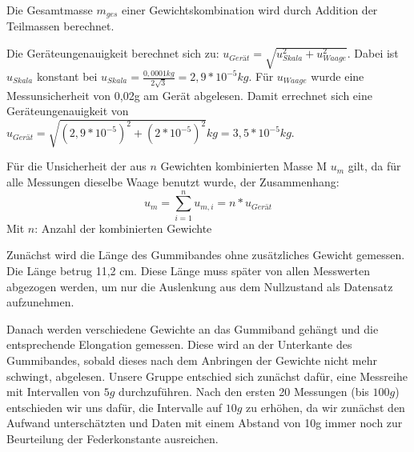 \documentclass[class=article, crop=false]{standalone}
\newenvironment{Shaded}{\begin{snugshade}}{\end{snugshade}}
\newcommand{\CommentTok}[1]{\textcolor[rgb]{0.56,0.35,0.01}{\textit{#1}}}
\newcommand{\DecValTok}[1]{\textcolor[rgb]{0.00,0.00,0.81}{#1}}
\newcommand{\FloatTok}[1]{\textcolor[rgb]{0.00,0.00,0.81}{#1}}
\newcommand{\FunctionTok}[1]{\textcolor[rgb]{0.00,0.00,0.00}{#1}}
\newcommand{\NormalTok}[1]{#1}
\newcommand{\OtherTok}[1]{\textcolor[rgb]{0.56,0.35,0.01}{#1}}
\newcommand{\SpecialCharTok}[1]{\textcolor[rgb]{0.00,0.00,0.00}{#1}}
\begin{document}
Die Gesamtmasse \(m_{ges}\) einer Gewichtskombination wird durch
Addition der Teilmassen berechnet.

Die Geräteungenauigkeit berechnet sich zu:
\(u_{Gerät}= \sqrt{u_{Skala}^2+u_{Waage}^2}\). Dabei ist \(u_{Skala}\)
konstant bei \(u_{Skala} = \frac{0,0001kg}{2\sqrt{3}}=2,9*10^{-5}kg\).
Für \(u_{Waage}\) wurde eine Messunsicherheit von 0,02g am Gerät
abgelesen. Damit errechnet sich eine Geräteungenauigkeit von
\(u_{Gerät}=\sqrt{(2,9*10^{-5})^2+(2*10^{-5})^2}kg=3,5*10^{-5}kg\).

Für die Unsicherheit der aus \(n\) Gewichten kombinierten Masse M
\(u_{m}\) gilt, da für alle Messungen dieselbe Waage benutzt wurde, der
Zusammenhang: \[u_m = \sum\limits_{i=1}^{n}u_{m,i} = n*u_{Gerät}\] Mit
\(n\): Anzahl der kombinierten Gewichte

\begin{Shaded}
\end{Shaded}

Zunächst wird die Länge des Gummibandes ohne zusätzliches Gewicht
gemessen. Die Länge betrug 11,2 cm. Diese Länge muss später von allen
Messwerten abgezogen werden, um nur die Auslenkung aus dem Nullzustand
als Datensatz aufzunehmen.

Danach werden verschiedene Gewichte an das Gummiband gehängt und die
entsprechende Elongation gemessen. Diese wird an der Unterkante des
Gummibandes, sobald dieses nach dem Anbringen der Gewichte nicht mehr
schwingt, abgelesen. Unsere Gruppe entschied sich zunächst dafür, eine
Messreihe mit Intervallen von \(5g\) durchzuführen. Nach den ersten 20
Messungen (bis \(100g\)) entschieden wir uns dafür, die Intervalle auf
\(10g\) zu erhöhen, da wir zunächst den Aufwand unterschätzten und Daten
mit einem Abstand von 10g immer noch zur Beurteilung der Federkonstante
ausreichen.
\end{document}
